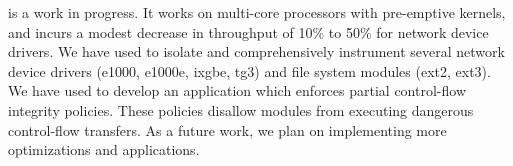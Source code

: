 \documentclass[10pt,preprint,nocopyrightspace]{sigplanconf}
\begin{document}

{\Sysname} is a work in progress. It works on multi-core processors with pre-emptive kernels, and incurs a modest decrease in throughput of 10\% to 50\% for network device drivers. We have used {\sysname} to isolate and comprehensively instrument several network device drivers (e1000, e1000e, ixgbe, tg3) and file system modules (ext2, ext3). We have used {\sysname} to develop an application which enforces partial control-flow integrity policies. These policies disallow modules from executing dangerous control-flow transfers. As a future work, we plan on implementing more optimizations and applications. 




\end{document}
